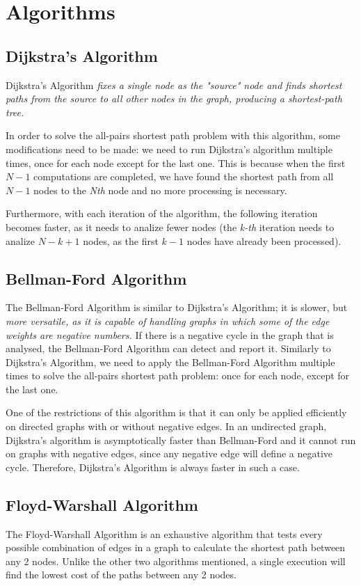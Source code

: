 \documentclass[runningheads]{llncs}
\begin{document}
\section{Algorithms}
\subsection{Dijkstra's Algorithm}
Dijkstra's Algorithm \textit{fixes a single node as the "source" node and finds shortest paths from the source to all other nodes in the graph, producing a shortest-path tree.}\cite{ref_url_Dj} 

In order to solve the all-pairs shortest path problem with this algorithm, some modifications need to be made: we need to run Dijkstra's algorithm multiple times, once for each node except for the last one. This is because when the first \(N - 1\) computations are completed, we have found the shortest path from all \(N - 1\) nodes to the \textit{Nth} node and no more processing is necessary. 

Furthermore, with each iteration of the algorithm, the following iteration becomes faster, as it needs to analize fewer nodes (the \textit{k-th} iteration needs to analize \(N - k + 1\) nodes, as the first \(k - 1\) nodes have already been processed).

\subsection{Bellman-Ford Algorithm}
The Bellman-Ford Algorithm is similar to Dijkstra's Algorithm; it is slower, but \textit{more versatile, as it is capable of handling graphs in which some of the edge weights are negative numbers.}\cite{ref_url_BF} If there is a negative cycle in the graph that is analysed, the Bellman-Ford Algorithm can detect and report it. Similarly to Dijkstra's Algorithm, we need to apply the Bellman-Ford Algorithm multiple times to solve the all-pairs shortest path problem: once for each node, except for the last one.

One of the restrictions of this algorithm is that it can only be applied efficiently on directed graphs with or without negative edges. In an undirected graph, Dijkstra's algorithm is asymptotically faster than Bellman-Ford and it cannot run on graphs with negative edges, since any negative edge will define a negative cycle. Therefore, Dijkstra's Algorithm is always faster in such a case.

\subsection{Floyd-Warshall Algorithm}
The Floyd-Warshall Algorithm is an exhaustive algorithm that tests every possible combination of edges in a graph to calculate the shortest path between any 2 nodes. Unlike the other two algorithms mentioned, a single execution will find the lowest cost of the paths between any 2 nodes.
\end{document}
